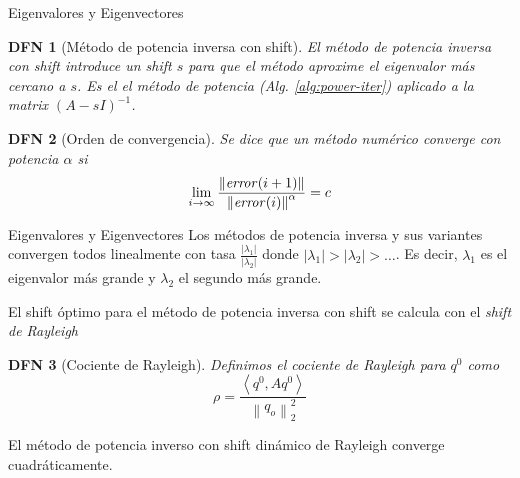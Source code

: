 \documentclass[a4paper]{article}
\newtheorem{definition}{DFN}
\theoremstyle{mytheoremstyle}
\providecommand{\norm}[1]{\left\|#1\right\|}
\providecommand{\dotp}[1]{\left\langle#1\right\rangle}
\begin{document}
\begin{multicols*}{3}
\begin{roundbox}{Eigenvalores y Eigenvectores}
    \begin{definition}[Método de potencia inversa con shift] 
        El método de potencia inversa con shift introduce un shift $s$ para que el método aproxime el eigenvalor más cercano a $s$.
        Es el el método de potencia (Alg. \ref{alg:power-iter}) aplicado a la matrix $(A- sI)^{-1}$.
    \end{definition}

    \begin{definition}[Orden de convergencia] 
        Se dice que un método numérico converge con potencia $\alpha$ si
        \[
            \lim_{i\to\infty} \frac{\norm{\text{\emph{error}}(i+1)}}{\norm{\text{\emph{error}}(i)}^{\alpha}} = c  
        \] 
    \end{definition}
\end{roundbox}

\begin{roundbox}{Eigenvalores y Eigenvectores}
    Los métodos de potencia inversa y sus variantes convergen todos linealmente con tasa $\frac{|\lambda_1|}{|\lambda_2|}$ donde $|\lambda_1| > |\lambda_2| > \dots$.
    Es decir, $\lambda_1$ es el eigenvalor más grande y $\lambda_2$ el segundo más grande. 
    
    El shift óptimo para el método de potencia inversa con shift se calcula con el \emph{shift de Rayleigh}

    \begin{definition}[Cociente de Rayleigh] 
        Definimos el cociente de Rayleigh para $q^0$ como 
        \[
            \rho = \frac{\dotp{q^0, Aq^0}}{\norm{q_o}_{2}^{2}}    
        \]
    \end{definition}

    El método de potencia inverso con shift dinámico de Rayleigh converge cuadráticamente.
\end{roundbox}

\end{multicols*}
\end{document}
